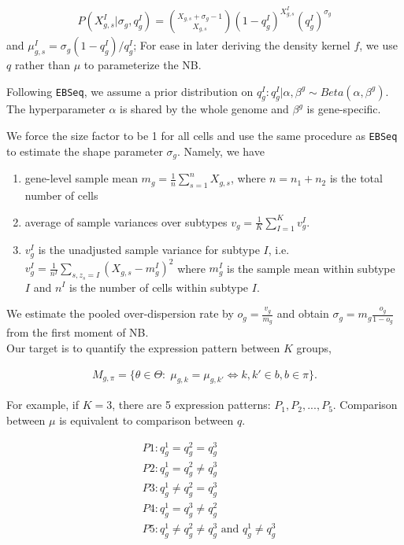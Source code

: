 \documentclass[aoas,preprint]{imsart}
\begin{document}
\begin{eqnarray*}
P(X_{g,s}^I | \sigma_g, q_g^I ) = {X_{g,s} + \sigma_g - 1 \choose X_{g,s} }(1 - q_g^I)^{X_{g,s}^I} (q_g^I)^{\sigma_g}
\end{eqnarray*}
and $\mu_{g,s}^I = \sigma_g(1 - q_g^I) / q_g^I$; For ease in later deriving the density kernel $f$, we use $q$ rather than $\mu$ to parameterize the NB.  %

Following \texttt{EBSeq}, we assume a prior distribution on $q_g^I : q_g^I | \alpha, \beta^{g} \sim Beta(\alpha, \beta^{g}).$ The hyperparameter $\alpha$ is shared by the whole genome and $\beta^{g}$ is gene-specific.
 

We force the size factor to be 1 for all cells and use the same procedure as \texttt{EBSeq} to estimate the shape parameter $\sigma_g$. Namely, we have\\
\begin{enumerate}
\item gene-level sample mean $m_g = \frac{1}{n}\sum_{s = 1}^n X_{g,s}$, where $n = n_1 + n_2$ is the total number of cells \\
\item average of sample variances over subtypes $v_g = \frac{1}{K} \sum_{I = 1}^K v_g^I$.\\
\item $v_g^I$ is the unadjusted sample variance for subtype $I$, i.e. $v_g^I = \frac{1}{n^I}\sum_{s, z_s = I} (X_{g,s} - m_g^I)^2$ where $m_g^I$ is the sample mean within subtype $I$ and $n^I$ is the number of cells within subtype $I$.\\
\end{enumerate}
We estimate the pooled over-dispersion rate by $o_g = \frac{v_g}{m_g}$ and obtain $\sigma_g = m_g \frac{o_g}{1 - o_g}$ from the first moment of NB.\\
Our target is to quantify the expression pattern between $K$ groups, 

\begin{eqnarray*}
M_{g,\pi} = \{ \theta \in \Theta: \; \mu_{g,k} = \mu_{g,k'} \iff k,k' \in b, b \in \pi \}.
\end{eqnarray*}



For example, if $K = 3$, there are 5 expression patterns: $P_1, P_2, ..., P_5$. Comparison between $\mu$ is equivalent to comparison between $q$.

\begin{align*}
&P1: q_g^1 = q_g^2 = q_g^3\\
&P2: q_g^1 = q_g^2 \neq q_g^3\\
&P3: q_g^1 \neq q_g^2 = q_g^3\\
&P4: q_g^1 = q_g^3 \neq q_g^2\\
&P5: q_g^1 \neq q_g^2 \neq q_g^3 \text{ and } q_g^1 \neq q_g^3
\end{align*}
\end{document}

